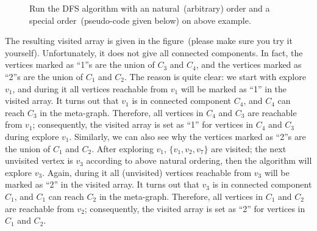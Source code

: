 \begin{figure}[h!]
\centering{}
\caption{Run the DFS algorithm with an natural~(arbitrary) order
and a special order~(pseudo-code given below) on above example.}
\label{fig:dfs-meta}
\end{figure}

The resulting visited array is given in the figure~(please make sure you try it yourself).
Unfortunately, it does not give all connected components. In fact, the vertices marked as ``1''s are the union of $C_3$ and $C_4$,
and the vertices marked as ``2''s are the union of $C_1$ and $C_2$.
The reason is quite clear: we start with explore $v_1$, and during it all vertices reachable from $v_1$ will be marked as ``1'' in the visited array.
It turns out that $v_1$ is in connected component $C_4$, and $C_4$ can reach $C_3$ in the meta-graph.
Therefore, all vertices in $C_4$ and $C_3$ are reachable from $v_1$; consequently, the visited array is set as ``1'' for 
vertices in $C_4$ and $C_3$ during explore $v_1$. 
Similarly, we can also see why the vertices marked as ``2''s are the union of $C_1$ and $C_2$.
After exploring $v_1$, $\{v_1,v_2,v_7\}$ are visited; the next unvisited vertex is $v_3$ according to above natural ordering,
then the algorithm will explore $v_3$.
Again, during it all (unvisited) vertices reachable from $v_3$ will be marked as ``2'' in the visited array.
It turns out that $v_3$ is in connected component $C_1$, and $C_1$ can reach $C_2$ in the meta-graph.
Therefore, all vertices in $C_1$ and $C_2$ are reachable from $v_2$;
consequently, the visited array is set as ``2'' for 
vertices in $C_1$ and $C_2$. 

